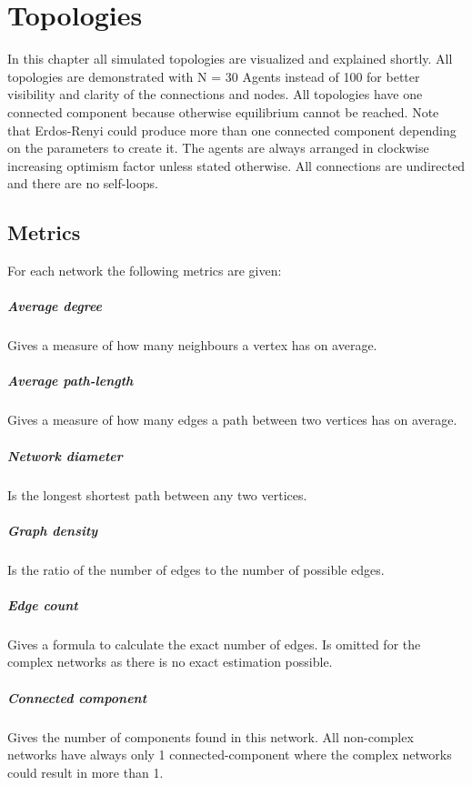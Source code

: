 \documentclass[Bachelorarbeit.tex]{subfiles}
\begin{document}
\graphicspath{{./figures/appendixTopologies/}}	%

\chapter{Topologies}
\label{app:topologies}
In this chapter all simulated topologies are visualized and explained shortly. All topologies are demonstrated with N = 30 Agents instead of 100 for better visibility and clarity of the connections and nodes. All topologies have one connected component because otherwise equilibrium cannot be reached. Note that Erdos-Renyi could produce more than one connected component depending on the parameters to create it. The agents are always arranged in clockwise increasing optimism factor unless stated otherwise. All connections are undirected and there are no self-loops.

\section{Metrics}
For each network the following metrics are given:

\paragraph{Average degree} Gives a measure of how many neighbours a vertex has on average.
\paragraph{Average path-length} Gives a measure of how many edges a path between two vertices has on average.
\paragraph{Network diameter} Is the longest shortest path between any two vertices.
\paragraph{Graph density} Is the ratio of the number of edges to the number of possible edges.
\paragraph{Edge count} Gives a formula to calculate the exact number of edges. Is omitted for the complex networks as there is no exact estimation possible.
\paragraph{Connected component} Gives the number of components found in this network. All non-complex networks have always only 1 connected-component where the complex networks could result in more than 1.
\end{document}
